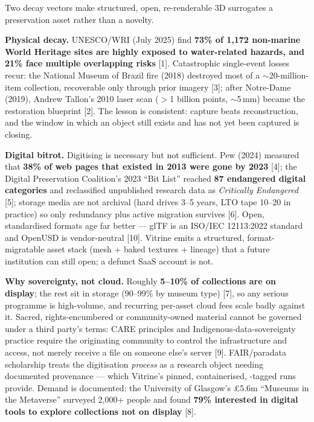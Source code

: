 \documentclass[a4paper,11pt]{article}
\begin{document}
Two decay vectors make structured, open, re-renderable 3D surrogates a preservation asset
rather than a novelty.

\textbf{Physical decay.} UNESCO/WRI (July 2025) find \textbf{73\% of 1,172 non-marine World
Heritage sites are highly exposed to water-related hazards, and 21\% face multiple overlapping
risks} [1]. Catastrophic single-event losses recur: the National Museum of Brazil fire (2018)
destroyed most of a $\sim$20-million-item collection, recoverable only through prior imagery
[3]; after Notre-Dame (2019), Andrew Tallon's 2010 laser scan ($>$1 billion points,
$\sim$5\,mm) became the restoration blueprint [2]. The lesson is consistent: capture beats
reconstruction, and the window in which an object still exists and has not yet been captured
is closing.

\textbf{Digital bitrot.} Digitising is necessary but not sufficient. Pew (2024) measured that
\textbf{38\% of web pages that existed in 2013 were gone by 2023} [4]; the Digital Preservation
Coalition's 2023 ``Bit List'' reached \textbf{87 endangered digital categories} and reclassified
unpublished research data as \emph{Critically Endangered} [5]; storage media are not archival
(hard drives 3--5 years, LTO tape 10--20 in practice) so only redundancy plus active migration
survives [6]. Open, standardised formats age far better --- glTF is an ISO/IEC 12113:2022
standard and OpenUSD is vendor-neutral [10]. Vitrine emits a structured, format-migratable
asset stack (mesh + baked textures +  lineage) that a future institution can still
open; a defunct SaaS account is not.

\textbf{Why sovereignty, not cloud.} Roughly \textbf{5--10\% of collections are on display};
the rest sit in storage (90--99\% by museum type) [7], so any serious programme is
high-volume, and recurring per-asset cloud fees scale badly against it. Sacred,
rights-encumbered or community-owned material cannot be governed under a third party's terms:
CARE principles and Indigenous-data-sovereignty practice require the originating community to
control the infrastructure and access, not merely receive a file on someone else's server [9].
FAIR/paradata scholarship treats the digitisation \emph{process} as a research object needing
documented provenance --- which Vitrine's pinned, containerised, -tagged runs
provide. Demand is documented: the University of Glasgow's \pounds5.6m ``Museums in the
Metaverse'' surveyed 2,000+ people and found \textbf{79\% interested in digital tools to
explore collections not on display} [8].
\end{document}
